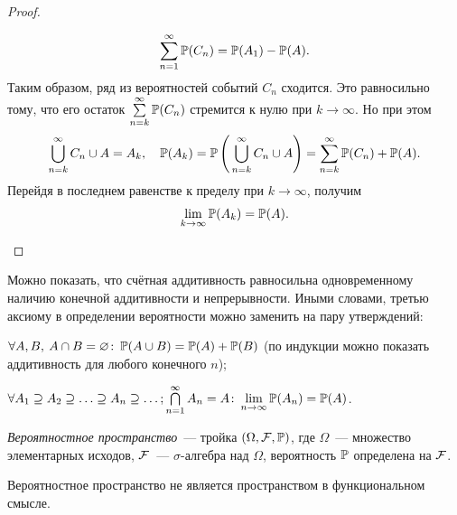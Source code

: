 \begin{proof}
\begin{enumerate}
\begin{gather*}
		      	\sum\limits_{n=1}^{\infty} \operatorname{\mathbb{P}}(C_n) = \operatorname{\mathbb{P}}(A_1) - \operatorname{\mathbb{P}}(A).
		      \end{gather*}
		      Таким образом, ряд из вероятностей событий $C_n$ сходится. 
		      Это равносильно тому, что его остаток $\sum\limits_{n=k}^{\infty} \operatorname{\mathbb{P}}(C_n)$ стремится к нулю при $k \to \infty$. 
		      Но при этом
		      \begin{equation*}
		      	\bigcup\limits_{n = k}^{\infty} C_n \cup A = A_k, \quad \operatorname{\mathbb{P}}(A_k) = \operatorname{\mathbb{P}}\left(\, {\bigcup\limits_{n = k}^{\infty} C_n \cup A} \right) = \sum\limits_{n=k}^{\infty} \operatorname{\mathbb{P}}(C_n) + \operatorname{\mathbb{P}}(A).
		      \end{equation*}
		      Перейдя в последнем равенстве к пределу при $k \to \infty$, получим
			  \begin{equation*}
				\lim\limits_{k \to \infty} \operatorname{\mathbb{P}}(A_k) = \operatorname{\mathbb{P}}(A). \qedhere
			  \end{equation*}
	\end{enumerate}
\end{proof}

\begin{rmrk}
	Можно показать, что счётная аддитивность равносильна одновременному наличию конечной аддитивности и непрерывности. 
	Иными словами, третью аксиому в определении вероятности можно заменить на пару утверждений:
	\begin{compactlist}
		\item 
		      $\forall A, B, \: A \cap B = \varnothing \colon \operatorname{\mathbb{P}}(A \cup B) = \operatorname{\mathbb{P}}(A) + \operatorname{\mathbb{P}}(B)$ 
		      (по индукции можно показать аддитивность для любого конечного $n$);
		\item 
		      $\forall A_1 \supseteq A_2 \supseteq \ldots \supseteq A_n \supseteq \ldots; \bigcap\limits_{n = 1}^{\infty} A_n = A \colon \lim\limits_{n \to \infty}\operatorname{\mathbb{P}}(A_n) = \operatorname{\mathbb{P}}(A)$.
	\end{compactlist}
\end{rmrk}

\hypertarget{prob_space}{}
\begin{defn}
	\textit{Вероятностное пространство}~--- тройка $(\Omega, \mathcal{F}, \operatorname{\mathbb{P}})$, где $\Omega$~--- множество элементарных исходов, 
	$\mathcal{F}$~--- $\sigma$-алгебра над $\Omega$, вероятность $\operatorname{\mathbb{P}}$ определена на $\mathcal{F}$.
\end{defn}
\begin{rmrk}
	Вероятностное пространство не является пространством в функциональном смысле.
\end{rmrk}

